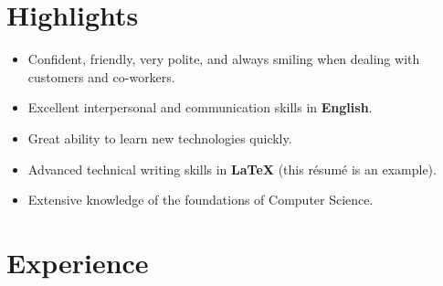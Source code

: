 \documentclass[letterpaper]{twentysecondcv} %
\begin{document}

\section{Highlights}

\begin{itemize}
    \item{Confident, friendly, very polite, and always smiling when 
          dealing with customers and co-workers.}
    \item{Excellent interpersonal and communication skills in \textbf{English}.}
    \item{Great ability to learn new technologies quickly.}
    \item{Advanced technical writing skills in \textbf{\LaTeX} (this r\'esum\'e is an example).}
    \item{Extensive knowledge of the foundations of Computer Science.}
\end{itemize}


\section{Experience}
\end{document}
